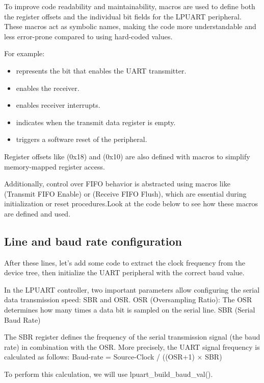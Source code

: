 To improve code readability and maintainability, macros are used to define both the register offsets and the individual bit fields for the LPUART peripheral. These macros act as symbolic names, making the code more understandable and less error-prone compared to using hard-coded values.

For example:
\begin{itemize}
  \item {} represents the bit that enables the UART transmitter.
  \item {} enables the receiver.
  \item {} enables receiver interrupts.
  \item {} indicates when the transmit data register is empty.
  \item {} triggers a software reset of the peripheral.
\end{itemize}

Register offsets like  (0x18) and  (0x10) are also defined with macros to simplify memory-mapped register access.

Additionally, control over FIFO behavior is abstracted using macros like  (Transmit FIFO Enable) or  (Receive FIFO Flush), which are essential during initialization or reset procedures.Look at the code below to see how these macros are defined and used.

\subsection{Line and baud rate configuration}

After these lines, let’s add some code to extract the clock frequency from the device tree, then initialize the UART peripheral with the correct baud value.

In the LPUART controller, two important parameters allow configuring the serial data transmission speed: SBR and OSR.
OSR (Oversampling Ratio): The OSR determines how many times a data bit is sampled on the serial line.
SBR (Serial Baud Rate)

The SBR register defines the frequency of the serial transmission signal (the baud rate) in combination with the OSR. More precisely, the UART signal frequency is calculated as follows:
Baud-rate = Source-Clock / ((OSR+1) × SBR)

To perform this calculation, we will use lpuart\_build\_baud\_val().

